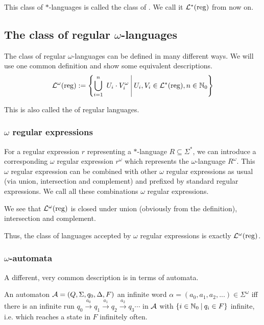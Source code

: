 This class of $*$-languages is called the class of . We call it $\mathcal{L}^*(\textup{\textrm{reg}})$ from now on.



\subsection{The class of regular $\omega$-languages}
\label{reg-omega-lang}

The class of regular $\omega$-languages can be defined in many different ways. We will use one common definition and show some equivalent descriptions.
\[ \LangOreg := \Set{ \bigcup_{i=1}^n\ U_i \cdot V_i^\omega }{ U_i, V_i \in \Langreg, n \in \N_0 } \]

This is also called the  of regular languages.

\subsubsection{$\omega$ regular expressions}

For a regular expression $r$ representing a $*$-language $R\subseteq \Sigma^*$, we can introduce a corresponding $\omega$ regular expression $r^\omega$ which represents the $\omega$-language $R^\omega$. This $\omega$ regular expression can be combined with other $\omega$ regular expressions as usual (via union, intersection and complement) and prefixed by standard regular expressions. We call all these combinations $\omega$ regular expressions.

We see that $\mathcal{L}^\omega(\textup{\textrm{reg}})$ is closed under union (obviously from the definition), intersection and complement.

Thus, the class of languages accepted by $\omega$ regular expressions is exactly $\mathcal{L}^\omega(\textup{\textrm{reg}})$.


\subsubsection{$\omega$-automata}

A different, very common description is in terms of automata.

An automaton $\mathcal{A} = (Q, \Sigma, q_0, \Delta, F)$  an infinite word $\alpha = (a_0,a_1,a_2,...) \in \Sigma^\omega$ iff there is an infinite run $q_0 \xrightarrow{a_0} q_1 \xrightarrow{a_1} q_2 \xrightarrow{a_2} q_3 \cdots$ in $\mathcal{A}$ with $\Set{ i \in \N_0 }{ q_i \in F }$ infinite, i.e. which reaches a state in $F$ infinitely often.

